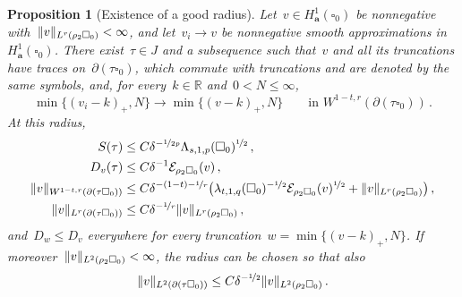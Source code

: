 \documentclass[11pt,letterpaper]{article}
\numberwithin{equation}{section}
\newtheorem{proposition}[theorem]{Proposition}
\theoremstyle{definition}
\newcommand{\R}{\mathbb{R}}
\renewcommand{\a}{\mathbf{a}}
\newcommand{\nf}{\nicefrac}
\newcommand{\cu}{\square}
\DeclarePairedDelimiter{\norm}{\lVert}{\rVert}
\newcommand{\Ener}{\mathcal E}
\begin{document}
\begin{proposition}[Existence of a good radius]
\label{p.good.radius}
Let~$v\in H^1_\a(\cu_0)$ be nonnegative with~$\norm{v}_{L^r(\rho_2\cu_0)}<\infty$, and let~$v_i\to v$ be nonnegative smooth approximations in~$H^1_\a(\cu_0)$. There exist~$\tau\in J$ and a subsequence such that~$v$ and all its truncations have traces on~$\partial(\tau\cu_0)$, which commute with truncations and are denoted by the same symbols, and, for every~$k\in\R$ and~$0<N\leq\infty$,
\begin{equation}
	\min\{(v_i-k)_+,N\}\to\min\{(v-k)_+,N\}\qquad\mbox{in }W^{1-t,r}(\partial(\tau\cu_0))\,.
	\label{e.good.radius.convergence}
\end{equation}
At this radius,
\begin{align}
	S(\tau)&\leq C\delta^{-\nf1{2p}}\Lambda_{s,1,p}(\cu_0)^{\nf12}\,,
	\label{e.good.radius.matrices}\\
	D_v(\tau)&\leq C\delta^{-1}\Ener_{\rho_2\cu_0}(v)\,,
	\label{e.good.radius.boundary.energy}\\
	\norm{v}_{W^{1-t,r}(\partial(\tau\cu_0))}&\leq C\delta^{-(1-t)-\nf1r}\bigl(\lambda_{t,1,q}(\cu_0)^{-\nf12}\Ener_{\rho_2\cu_0}(v)^{\nf12}+\norm{v}_{L^r(\rho_2\cu_0)}\bigr)\,,
	\label{e.good.radius.fractional}\\
	\norm{v}_{L^r(\partial(\tau\cu_0))}&\leq C\delta^{-\nf1r}\norm{v}_{L^r(\rho_2\cu_0)}\,,
	\label{e.good.radius.trace.lr}
\end{align}
and~$D_w\leq D_v$ everywhere for every truncation~$w=\min\{(v-k)_+,N\}$. If moreover~$\norm{v}_{L^2(\rho_2\cu_0)}<\infty$, the radius can be chosen so that also
\begin{equation}
	\norm{v}_{L^2(\partial(\tau\cu_0))}\leq C\delta^{-\nf12}\norm{v}_{L^2(\rho_2\cu_0)}\,.
	\label{e.good.radius.trace.l2}
\end{equation}
\end{proposition}
\end{document}
